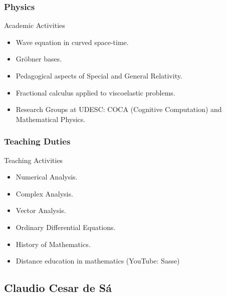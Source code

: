 \documentclass{beamer}
\begin{document}
\subsubsection{Physics}

\begin{frame}{Academic Activities}

\begin{itemize}
  \item Wave equation in curved space-time.
  \item Gr\"obner bases.
  \item Pedagogical aspects of Special and General Relativity.
  \item Fractional calculus applied to viscoelastic problems.
  \item Research Groups at UDESC: COCA (Cognitive Computation) and Mathematical Physics.
\end{itemize}
\end{frame}

\subsubsection{Teaching Duties}

\begin{frame}{Teaching Activities}

\begin{itemize}
  \item Numerical Analysis.
  \item Complex Analysis.
  \item Vector Analysis.
  \item Ordinary Differential Equations.
  \item History of Mathematics.
  \item Distance education in mathematics (YouTube: Sasse)
\end{itemize}
\end{frame}

\subsection{Claudio Cesar de Sá}
\end{document}

